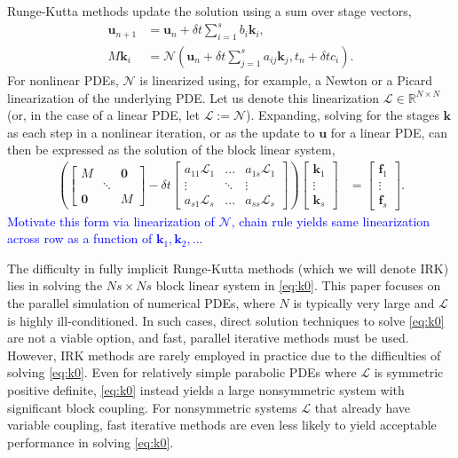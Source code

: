 \documentclass[review]{siamart}
\newcommand{\tcb}{\textcolor{blue}}
\begin{document}
Runge-Kutta methods update the solution using a sum over stage vectors,
%
\begin{align}\label{eq:update}
\mathbf{u}_{n+1} & = \mathbf{u}_n + \delta t \sum_{i=1}^s b_i\mathbf{k}_i, \\
M\mathbf{k}_i & = \mathcal{N}\left(\mathbf{u}_n + \delta t\sum_{j=1}^s a_{ij}\mathbf{k}_j, t_n+\delta tc_i\right).\label{eq:stages}
\end{align}
%
For nonlinear PDEs, $\mathcal{N}$ is linearized using, for example, a Newton or a Picard
linearization of the underlying PDE. Let us denote this linearization
${\mathcal{L}}\in\mathbb{R}^{N\times N}$
(or, in the case of a linear PDE, let $\mathcal{L} := \mathcal{N}$).
Expanding, solving for the stages $\mathbf{k}$ as each step in a nonlinear iteration, or
as the update to $\mathbf{u}$ for a linear PDE, can then be expressed as the
solution of the block linear system,
%
\begin{align}\label{eq:k0}
\left( \begin{bmatrix} M  & & \mathbf{0} \\ & \ddots \\ \mathbf{0} & & M\end{bmatrix}
	- \delta t \begin{bmatrix} a_{11}\mathcal{L}_1 & ... & a_{1s}\mathcal{L}_1 \\
	\vdots & \ddots & \vdots \\ a_{s1}\mathcal{L}_s & ... & a_{ss} \mathcal{L}_s \end{bmatrix} \right)
	\begin{bmatrix} \mathbf{k}_1 \\ \vdots \\ \mathbf{k}_s \end{bmatrix} 
& = \begin{bmatrix} \mathbf{f}_1 \\ \vdots \\ \mathbf{f}_s \end{bmatrix}.
\end{align}
%
\tcb{Motivate this form via linearization of $\mathcal{N}$, chain rule
yields same linearization across row as a function of $\mathbf{k}_1,\mathbf{k}_2,...$}

The difficulty in fully implicit Runge-Kutta methods (which we will denote IRK) lies in
solving the $Ns\times Ns$ block linear system in \eqref{eq:k0}. This paper focuses on the
parallel simulation of numerical PDEs, where $N$ is typically very large
and $\mathcal{L}$ is highly ill-conditioned. In such cases, direct
solution techniques to solve \eqref{eq:k0} are not a viable option, and fast, parallel 
iterative methods must be used. However, IRK methods are rarely employed in practice due
to the difficulties of solving \eqref{eq:k0}. Even for relatively simple
parabolic PDEs where $\mathcal{L}$ is symmetric positive definite, \eqref{eq:k0}
instead yields a large nonsymmetric system with significant block coupling. For
nonsymmetric systems $\mathcal{L}$ that already have variable coupling, fast iterative
methods are even less likely to yield acceptable performance in solving \eqref{eq:k0}.
\end{document}

